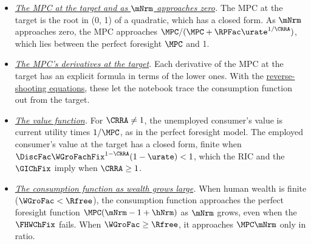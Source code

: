 \documentclass{econark}
\begin{document}
\begin{itemize}
\item \emph{\hyperref[sec:TractableBufferStock-MPC]{The MPC at the target and as $\mNrm$ approaches zero}.}  The MPC at the target is the root in (0, 1) of a quadratic, which has a closed form.  As $\mNrm$ approaches zero, the MPC approaches $\MPC/(\MPC+\RPFac\urate^{1/\CRRA})$, which lies between the perfect foresight $\MPC$ and 1.
\item \emph{\hyperref[sec:TractableBufferStock-MPCDerivatives]{The MPC's derivatives at the target}.}  Each derivative of the MPC at the target has an explicit formula in terms of the lower ones.  With the \hyperref[sec:TractableBufferStock-ReverseShooting]{reverse-shooting equations}, these let the notebook trace the consumption function out from the target.
\item \emph{\hyperref[sec:TractableBufferStock-ValueFunction]{The value function}.}  For $\CRRA \neq 1$, the unemployed consumer's value is current utility times $1/\MPC$, as in the perfect foresight model.  The employed consumer's value at the target has a closed form, finite when $\DiscFac\WGroFachFix^{1-\CRRA}(1-\urate) < 1$, which the RIC and the $\GIChFix$ imply when $\CRRA \geq 1$.
\item \emph{\hyperref[sec:PGroGEQRfree]{The consumption function as wealth grows large}.}  When human wealth is finite ($\WGroFac < \Rfree$), the consumption function approaches the perfect foresight function $\MPC(\mNrm-1+\hNrm)$ as $\mNrm$ grows, even when the $\FHWChFix$ fails.  When $\WGroFac \geq \Rfree$, it approaches $\MPC\mNrm$ only in ratio.
\end{itemize}

\pagebreak


\end{document}
